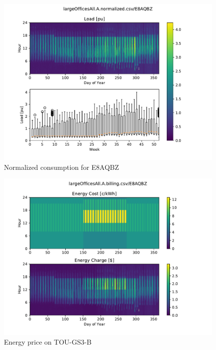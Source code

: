 \documentclass[11pt]{article}
\begin{document}
\begin{figure}[!h]
\centering
\includegraphics[width=\columnwidth, page=1, trim=0in 0.45in 0in 0.45in, clip]{visuals/E8AQBZ.heatmap.pdf}
\caption{Normalized consumption for E8AQBZ}
\label{fig:heatmap}
\end{figure}

\begin{figure}[!h]
\centering
\includegraphics[width=\columnwidth, page=1, trim=0in 3in 0in 0.45in, clip]{visuals/E8AQBZ.billing.Heatmap.pdf}
\caption{Energy price on TOU-GS3-B}
\label{fig:toumap}
\end{figure}

\lipsum[1][1-7]
\end{document}
